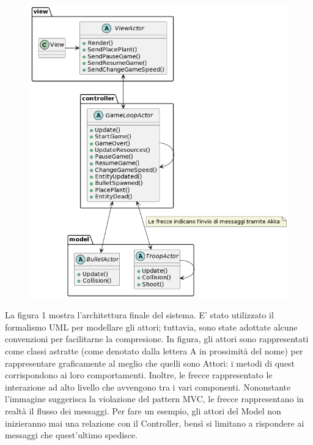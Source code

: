 \begin{figure}[H]
    \centering
    \includegraphics[width=\linewidth]{images/actor-architecture}
    \label{Diagramma delle classi dell'architettura complessiva.}
\end{figure}
La figura 1 mostra l'architettura finale del sistema.
E' stato utilizzato il formalismo UML per modellare gli attori;
tuttavia, sono state adottate alcune convenzioni per facilitarne la compresione.
In figura, gli attori sono rappresentati
come classi astratte (come denotato dalla lettera A in prossimità del nome) per rappresentare graficamente al meglio che
quelli sono Attori: i metodi di quest corrispondono ai loro comportamenti.
Inoltre, le frecce rappresentato le interazione ad alto livello che avvengono tra i vari componenti.
Nononstante l'immagine  suggerisca la violazione del pattern MVC, le frecce rappresentano in realtà il flusso dei messaggi.
Per fare un esempio, gli attori del Model non inizieranno mai una relazione con il Controller,
bensì si limitano a rispondere ai messaggi che quest'ultimo spedisce.

